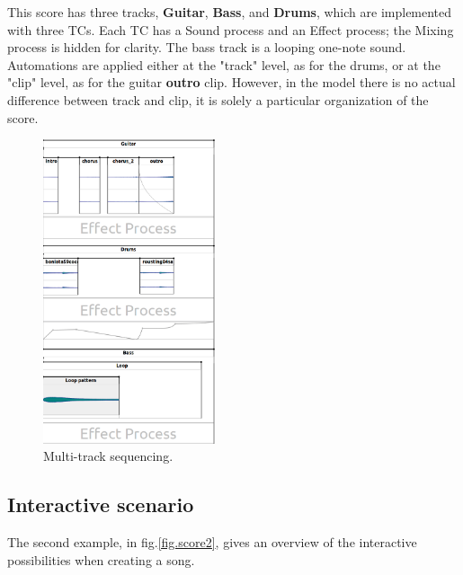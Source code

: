 \documentclass{article}
\newcommand*{\timeconstraint}{\ac{TC}\xspace}
\newcommand*{\timeconstraints}{\acp{TC}\xspace}
\begin{document}
This score has three tracks, \textbf{Guitar}, \textbf{Bass}, and \textbf{Drums}, which are implemented with three \timeconstraints.
Each \timeconstraint has a Sound process and an Effect process; the Mixing process is hidden for clarity.
The bass track is a looping one-note sound. Automations are applied either at the "track" level, as for the drums, or at the "clip" level, as for the guitar \textbf{outro} clip. 
However, in the model there is no actual difference between track and clip, it is solely a particular organization of the score.
 
\begin{figure}[h]
    \centering
    \includegraphics[width=0.45\textwidth]{figures/ex1.png}
    \caption{Multi-track sequencing.}
    \label{fig.score1}
\end{figure}

\subsection{Interactive scenario}
The second example, in fig.\ref{fig.score2}, gives an overview of the interactive possibilities when creating a song.
\end{document}
